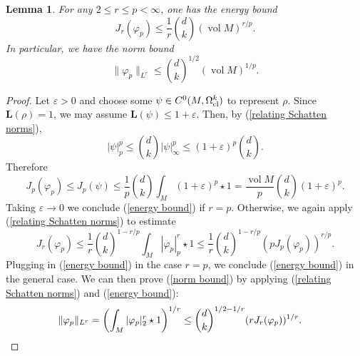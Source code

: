 \documentclass[reqno,11pt]{amsart}
\DeclareMathOperator{\vol}{vol}
\newcommand{\Comass}{\mathbf L}
\newtheorem{lemma}[theorem]{Lemma}
\theoremstyle{definition}
\numberwithin{equation}{section}
\begin{document}
\begin{lemma}
For any $2 \leq r \leq p < \infty$, one has the energy bound
\begin{equation}\label{energy bound}
J_r(\varphi_p) \leq \frac{1}{r} \binom dk (\vol M)^{r/p}.
\end{equation}
In particular, we have the norm bound 
\begin{equation}\label{norm bound}
\|\varphi_p\|_{L^r} \leq \binom dk^{1/2} (\vol M)^{1/p}.
\end{equation}
\end{lemma}
\begin{proof}
Let $\varepsilon > 0$ and choose some $\psi \in C^0(M, \Omega^k_{\rm cl})$ to represent $\rho$.
Since $\Comass(\rho) = 1$, we may assume $\Comass(\psi) \leq 1 + \varepsilon$.
Then, by (\ref{relating Schatten norms}),
$$|\psi|_p^p \leq \binom dk|\psi|_\infty^p \leq (1 + \varepsilon)^p \binom dk.$$
Therefore 
$$J_p(\varphi_p) \leq J_p(\psi) \leq \frac{1}{p} \binom dk \int_M (1 + \varepsilon)^p \star 1 = \frac{\vol M}{p} \binom dk (1 + \varepsilon)^p.$$
Taking $\varepsilon \to 0$ we conclude (\ref{energy bound}) if $r = p$.
Otherwise, we again apply (\ref{relating Schatten norms}) to estimate 
$$J_r(\varphi_p) \leq \frac{1}{r} \binom dk^{1 - r/p} \int_M |\varphi_p|_p^r \star 1 \leq \frac{1}{r} \binom dk^{1 - r/p} (pJ_p(\varphi_p))^{r/p}.$$
Plugging in (\ref{energy bound}) in the case $r = p$, we conclude (\ref{energy bound}) in the general case.
We can then prove (\ref{norm bound}) by applying (\ref{relating Schatten norms}) and (\ref{energy bound}):
\begin{align*}
\|\varphi_p\|_{L^r} &= \left(\int_M |\varphi_p|_2^r \star 1\right)^{1/r} \leq \binom dk^{1/2 - 1/r} (rJ_r(\varphi_p))^{1/r}. \qedhere 
\end{align*}
\end{proof}
\end{document}

